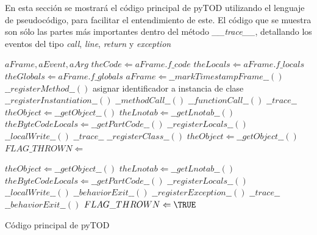 \documentclass[12pt,legalpaper]{report}
\begin{document}
En esta sección se mostrará el código principal de pyTOD utilizando el lenguaje de pseudocódigo, para facilitar el entendimiento de este.  El código que se muestra son sólo las partes más importantes dentro del método \textit{\_\_trace\_\_}, detallando los eventos del tipo \textit{call}, \textit{line}, \textit{return} y \textit{exception}
\begin{algorithm}
\begin{footnotesize}
\begin{algorithmic}[1]
\REQUIRE $aFrame, aEvent, aArg$
\STATE $theCode \Leftarrow aFrame.f\_code$
\STATE $theLocals \Leftarrow aFrame.f\_locals$
\STATE $theGlobals \Leftarrow aFrame.f\_globals$
\STATE $aFrame \Leftarrow \_\_markTimestampFrame\_\_()$
		\STATE $\_\_registerMethod\_\_()$
			\STATE asignar identificador a instancia de clase
			\STATE $\_\_registerInstantiation\_\_()$
		\ELSE
			\STATE $\_\_methodCall\_\_()$
		\ENDIF
	\ELSE
			\STATE $\_\_functionCall\_\_()$
		\ENDIF
	\ENDIF
	\RETURN $\_\_trace\_\_$
	\STATE $theObject \Leftarrow \_\_getObject\_\_()$
	\STATE $theLnotab \Leftarrow \_\_getLnotab\_\_()$
		\STATE $theByteCodeLocals \Leftarrow \_\_getPartCode\_\_()$
		\STATE $\_\_registerLocals\_\_()$
		\STATE $\_\_localWrite\_\_()$
	\ENDIF
	\RETURN $\_\_trace\_\_$
			\STATE $\_\_registerClass\_\_()$
		\ENDIF
	\ELSE
		\STATE $theObject \Leftarrow \_\_getObject\_\_()$
			\STATE $FLAG\_THROWN \Leftarrow$ \FALSE
		\ENDIF

		\STATE $theObject \Leftarrow \_\_getObject\_\_()$
		\STATE $theLnotab \Leftarrow \_\_getLnotab\_\_()$
			\STATE $theByteCodeLocals \Leftarrow \_\_getPartCode\_\_()$
			\STATE $\_\_registerLocals\_\_()$
			\STATE $\_\_localWrite\_\_()$
		\ENDIF
		\STATE $\_\_behaviorExit\_\_()$	
	\ENDIF
{}
	\STATE $\_\_registerException\_\_()$
		\RETURN $\_\_trace\_\_$
	\ENDIF
	\STATE $\_\_behaviorExit\_\_()$
	\STATE $FLAG\_THROWN \Leftarrow \TRUE$
\ENDIF
\end{algorithmic}
\end{footnotesize}
\caption{Código principal de pyTOD}
\end{algorithm}
\end{document}
